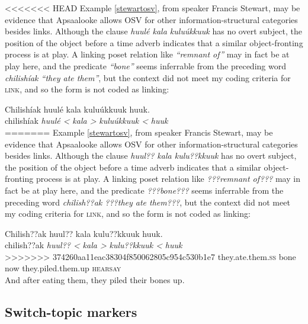 \documentclass[output=paper]{LSP/langsci}
\begin{document}
<<<<<<< HEAD
Example \ref{stewartosv}, from speaker Francis Stewart, may be evidence that Apsaalooke allows OSV for other information-structural categories besides links. Although the clause \emph{huulé kala kuluúkkuuk} has no overt subject, the position of the object before a time adverb indicates that a similar object-fronting process is at play. A linking poset relation like \emph{“remnant of”} may in fact be at play here, and the predicate \emph{“bone”} seems inferrable from the preceding word \emph{chilishíak “they ate them”}, but the context did not meet my coding criteria for \textsc{link}, and so the form is not coded as linking:

\ea\label{stewartosv}
Chilishíak huulé kala kuluúkkuuk huuk.\footnotemark\\
\gll	chilishíak 				\emph{huulé <}	\emph{kala >}	\emph{kuluúkkuuk <}	\emph{huuk}\\
=======
Example \ref{stewartosv}, from speaker Francis Stewart, may be evidence that Apsaalooke allows OSV for other information-structural categories besides links. Although the clause \emph{huul?? kala kulu??kkuuk} has no overt subject, the position of the object before a time adverb indicates that a similar object-fronting process is at play. A linking poset relation like \emph{???remnant of???} may in fact be at play here, and the predicate \emph{???bone???} seems inferrable from the preceding word \emph{chilish??ak ???they ate them???}, but the context did not meet my coding criteria for \textsc{link}, and so the form is not coded as linking:

\ea\label{stewartosv}
Chilish??ak huul?? kala kulu??kkuuk huuk.\footnotemark\\
\gll	chilish??ak 				\emph{huul?? <}	\emph{kala >}	\emph{kulu??kkuuk <}	\emph{huuk}\\
>>>>>>> 374260aa11eac38304f850062805c954c530b1e7
	they.ate.them.\textsc{ss} 	bone 			now 			they.piled.them.up 		\textsc{hearsay}\\
\glt	And after eating them, they piled their bones up.
\z

\subsection{Switch-topic markers}\label{switchtopic}
\end{document}
